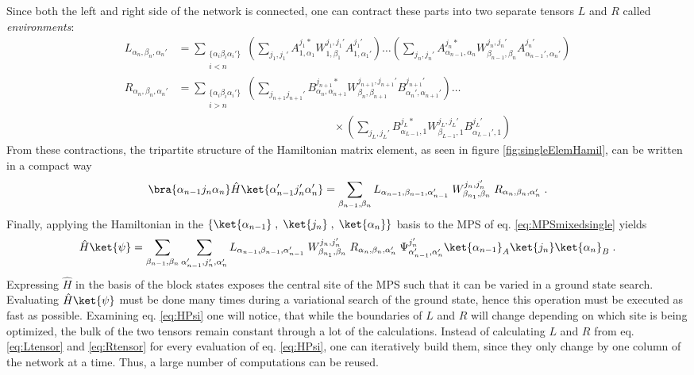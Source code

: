 Since both the left and right side of the network is connected, one can contract these parts into two separate tensors $L$ and $R$ called \textit{environments}:
\begin{align}
	L_{\alpha_{n}, \beta_{n} , \alpha_{n} '} &= \sum_{ \substack{ \{ \alpha_i \beta_i \alpha_i ' \} \\ i < n}} \left( \sum_{j_1 , j_1 '} A_{1 , \alpha_1}^{j_1 *} W_{1, \beta_1}^{j_1 , j_1 '} A_{1 , \alpha_1 '}^{j_1 '} \right) \ldots \left( \sum_{j_{n} , j_{n} '} A_{\alpha_{n-1} , \alpha_{n}}^{j_{n} *} W_{\beta_{n-1}, \beta_{n}}^{j_{n} , j_{n} '} A_{\alpha_{n-1} ' , \alpha_{n} '}^{j_{n} '} \right) \label{eq:Ltensor} \\
	R_{\alpha_{n} ,\beta_{n} , \alpha_{n} '} &= \sum_{ \substack{ \{ \alpha_i \beta_i \alpha_i ' \} \\ i > n}} \left( \sum_{j_{n+1}  j_{n+1} '} B_{\alpha_n , \alpha_{n+1}}^{j_{n+1} *} W_{\beta_n, \beta_{n+1}}^{j_{n+1} , j_{n+1} '} B_{\alpha_n ', \alpha_{n+1} '}^{j_{n+1} '} \right) \ldots \nonumber \\
	& \qquad \qquad \qquad \qquad \qquad \qquad \qquad \times \left( \sum_{j_{L} , j_{L} '} B_{\alpha_{L-1} , 1}^{j_{L} *} W_{\beta_{L-1}, 1}^{j_{L} , j_{L} '} B_{\alpha_{L-1}' , 1 }^{j_{L} '} \right) \label{eq:Rtensor}
\end{align}
From these contractions, the tripartite structure of the Hamiltonian matrix element, as seen in figure \ref{fig:singleElemHamil}, can be written in a compact way
\begin{equation}
	\bra{\alpha_{n-1} j_n \alpha_{n}} \hat{H} \ket{\alpha_{n-1} ' j_n ' \alpha_{n} '} = \sum_{\beta_{n-1} , \beta_{n}} L_{\alpha_{n-1}, \beta_{n-1} , \alpha_{n-1} '} \; W_{\beta_{n_1}, \beta_n}^{j_n , j_n '} \; R_{\alpha_{n} ,\beta_{n} , \alpha_{n} '} \; .
\end{equation}
Finally, applying the Hamiltonian in the $\{ \ket{\alpha_{n-1} } \; , \; \ket{ j_n } \; , \; \ket{\alpha_{n} } \}$ basis to the MPS of eq. \eqref{eq:MPSmixedsingle} yields \cite{schollwock}
\begin{equation}
	\hat{H} \ket{\psi} = \sum_{\beta_{n-1} , \beta_{n}} \sum_{\alpha_{n-1}' , j_n ', \alpha_{n}'} L_{\alpha_{n-1}, \beta_{n-1} , \alpha_{n-1} '} \; W_{\beta_{n_1}, \beta_n}^{j_n , j_n '} \; R_{\alpha_{n} ,\beta_{n} , \alpha_{n} '} \; \Psi_{\alpha_{n-1} ' , \alpha_{n} '}^{j_n '} \ket{\alpha_{n-1}}_A \ket{j_n} \ket{\alpha_{n}}_B \; .
	\label{eq:HPsi}
\end{equation}
Expressing $\hat{H}$ in the basis of the block states exposes the central site of the MPS such that it can be varied in a ground state search. Evaluating $\hat{H} \ket{\psi}$ must be done many times during a variational search of the ground state, hence this operation must be executed as fast as possible. Examining eq. \eqref{eq:HPsi} one will notice, that while the boundaries of $L$ and $R$ will change depending on which site is being optimized, the bulk of the two tensors remain constant through a lot of the calculations. Instead of calculating $L$ and $R$ from eq. \eqref{eq:Ltensor} and \eqref{eq:Rtensor} for every evaluation of eq. \eqref{eq:HPsi}, one can iteratively build them, since they only change by one column of the network at a time. Thus, a large number of computations can be reused.\\
